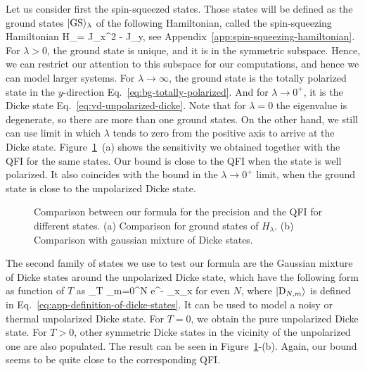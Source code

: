 Let us consider first the spin-squeezed states.
Those states will be defined as the ground states $\vert{\text{GS}}\rangle_\lambda$ of the following Hamiltonian, called the spin-squeezing Hamiltonian
\be
  H_\lambda = J_x^2 - \lambda J_y,
  \label{eq:vd-ss-hamiltonian}
\ee
see Appendix~\ref{app:spin-squeezing-hamiltonian}.
For $\lambda>0$, the ground state is unique, and it is in the symmetric subspace.
Hence, we can restrict our attention to this subspace for our computations, and hence we can model larger systems.
For $\lambda\rightarrow\infty$, the ground state is the totally polarized state in the $y$-direction Eq.~\eqref{eq:bg-totally-polarized}.
And for $\lambda\rightarrow 0^{+}$, it is the Dicke state Eq.~\eqref{eq:vd-unpolarized-dicke}.
Note that for $\lambda=0$ the eigenvalue is degenerate, so there are more than one ground states.
On the other hand, we still can use limit in which $\lambda$ tends to zero from the positive axis to arrive at the Dicke state.
Figure~\ref{fig:vd-comparing-the-bounds}~(a) shows the sensitivity we obtained together with the QFI for the same states.
Our bound is close to the QFI when the state is well polarized.
It also coincides with the bound in the $\lambda\rightarrow 0^{+}$ limit, when the ground state is close to the unpolarized Dicke state.
\begin{figure}[htp]
  \centering
  \caption[Bound against known QFIs for different states.]{Comparison between our formula for the precision and the QFI for different states. (a) Comparison for ground states of $H_\lambda$. (b) Comparison with gaussian mixture of Dicke states.}
  \label{fig:vd-comparing-the-bounds}
\end{figure}

The second family of states we use to test our formula are the Gaussian mixture of Dicke states around the unpolarized Dicke state,
which have the following form as function of $T$ as
\be
  \rho_{T} \propto \sum_{m=0}^{N} e^{- } _x_x
\ee
for even $N$, where $\vert{\ensuremath{\textnormal{D}_{N,m}}}\rangle$ is defined in Eq.~\eqref{eq:app-definition-of-dicke-states}.
It can be used to model a noisy or thermal unpolarized Dicke state.
For $T=0$, we obtain the pure unpolarized Dicke state.
For $T>0$, other symmetric Dicke states in the vicinity of the unpolarized one are also populated.
The result can be seen in Figure~\ref{fig:vd-comparing-the-bounds}-(b).
Again, our bound seems to be quite close to the corresponding QFI.

